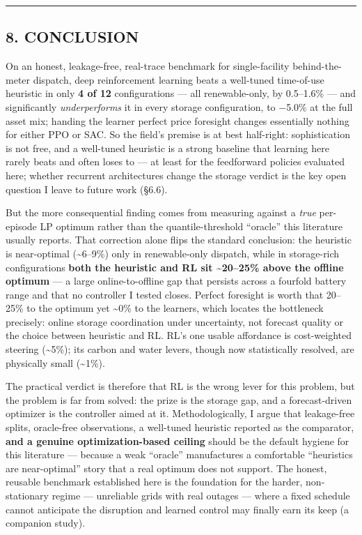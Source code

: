 \documentclass[
  11pt,
]{article}
\begin{document}
\begin{center}\rule{0.5\linewidth}{0.5pt}\end{center}

\subsection{8. CONCLUSION}\label{conclusion}

On an honest, leakage-free, real-trace benchmark for single-facility
behind-the-meter dispatch, deep reinforcement learning beats a
well-tuned time-of-use heuristic in only \textbf{4 of 12} configurations
--- all renewable-only, by 0.5--1.6\% --- and significantly
\emph{underperforms} it in every storage configuration, to −5.0\% at the
full asset mix; handing the learner perfect price foresight changes
essentially nothing for either PPO or SAC. So the field's premise is at
best half-right: sophistication is not free, and a well-tuned heuristic
is a strong baseline that learning here rarely beats and often loses to
--- at least for the feedforward policies evaluated here; whether
recurrent architectures change the storage verdict is the key open
question I leave to future work (§6.6).

But the more consequential finding comes from measuring against a
\emph{true} per-episode LP optimum rather than the quantile-threshold
``oracle'' this literature usually reports. That correction alone flips
the standard conclusion: the heuristic is near-optimal
(\textasciitilde6--9\%) only in renewable-only dispatch, while in
storage-rich configurations \textbf{both the heuristic and RL sit
\textasciitilde20--25\% above the offline optimum} --- a large
online-to-offline gap that persists across a fourfold battery range and
that no controller I tested closes. Perfect foresight is worth that
20--25\% to the optimum yet \textasciitilde0\% to the learners, which
locates the bottleneck precisely: online storage coordination under
uncertainty, not forecast quality or the choice between heuristic and
RL. RL's one usable affordance is cost-weighted steering
(\textasciitilde5\%); its carbon and water levers, though now
statistically resolved, are physically small (\textasciitilde1\%).

The practical verdict is therefore that RL is the wrong lever for this
problem, but the problem is far from solved: the prize is the storage
gap, and a forecast-driven optimizer is the controller aimed at it.
Methodologically, I argue that leakage-free splits, oracle-free
observations, a well-tuned heuristic reported as the comparator,
\textbf{and a genuine optimization-based ceiling} should be the default
hygiene for this literature --- because a weak ``oracle'' manufactures a
comfortable ``heuristics are near-optimal'' story that a real optimum
does not support. The honest, reusable benchmark established here is the
foundation for the harder, non-stationary regime --- unreliable grids
with real outages --- where a fixed schedule cannot anticipate the
disruption and learned control may finally earn its keep (a companion
study).
\end{document}
